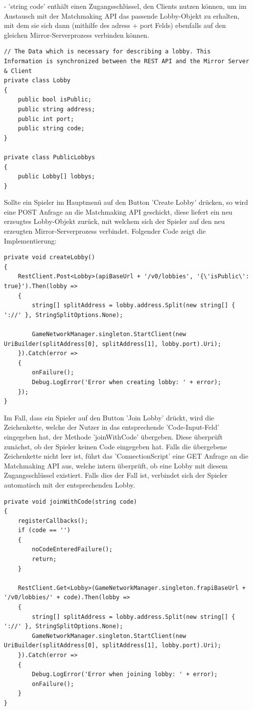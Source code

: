 - 'string code' enthält einen Zugangsschlüssel, den Clients nutzen können, um im Austausch mit der Matchmaking API das passende Lobby-Objekt zu erhalten, mit dem sie sich dann (mithilfe des adress + port Felds) ebenfalls auf den gleichen Mirror-Serverprozess verbinden können.

\begin{lstlisting}[caption= ConnectionScript.cs Matchmaking Data]
// The Data which is necessary for describing a lobby. This Information is synchronized between the REST API and the Mirror Server & Client
private class Lobby
{
	public bool isPublic;
	public string address;
	public int port;
	public string code;
}

private class PublicLobbys
{
	public Lobby[] lobbys;
}
\end{lstlisting}

Sollte ein Spieler im Hauptmenü auf den Button 'Create Lobby' drücken, so wird eine POST Anfrage an die Matchmaking API geschickt, diese liefert ein neu erzeugtes Lobby-Objekt zurück, mit welchem sich der Spieler auf den neu erzeugten Mirror-Serverprozess verbindet. Folgender Code zeigt die Implementierung:

\newpage

\begin{lstlisting}[caption= ConnectionScript.cs createLobby()]
private void createLobby()
{
	RestClient.Post<Lobby>(apiBaseUrl + '/v0/lobbies', '{\'isPublic\': true}').Then(lobby =>
	{
		string[] splitAddress = lobby.address.Split(new string[] { '://' }, StringSplitOptions.None);
		
		GameNetworkManager.singleton.StartClient(new UriBuilder(splitAddress[0], splitAddress[1], lobby.port).Uri);
	}).Catch(error =>
	{
		onFailure();
		Debug.LogError('Error when creating lobby: ' + error);
	});
}	
\end{lstlisting}

Im Fall, dass ein Spieler auf den Button 'Join Lobby' drückt, wird die Zeichenkette, welche der Nutzer in das entsprechende 'Code-Input-Feld' eingegeben hat, der Methode 'joinWithCode' übergeben. Diese überprüft zunächst, ob der Spieler keinen Code eingegeben hat. Falls die übergebene Zeichenkette nicht leer ist, führt das 'ConnectionScript' eine GET Anfrage an die Matchmaking API aus, welche intern überprüft, ob eine Lobby mit diesem Zugangsschlüssel existiert. Falls dies der Fall ist, verbindet sich der Spieler automatisch mit der entsprechenden Lobby. 

\begin{lstlisting}[caption= ConnectionScript.cs joinWithCode()]
private void joinWithCode(string code)
{
	registerCallbacks();
	if (code == '')
	{
		noCodeEnteredFailure();
		return;
	}
			
	RestClient.Get<Lobby>(GameNetworkManager.singleton.frapiBaseUrl + '/v0/lobbies/' + code).Then(lobby =>
	{
		string[] splitAddress = lobby.address.Split(new string[] { '://' }, StringSplitOptions.None);
		GameNetworkManager.singleton.StartClient(new UriBuilder(splitAddress[0], splitAddress[1], lobby.port).Uri);
	}).Catch(error =>
	{
		Debug.LogError('Error when joining lobby: ' + error);
		onFailure();
	}
}
\end{lstlisting}

